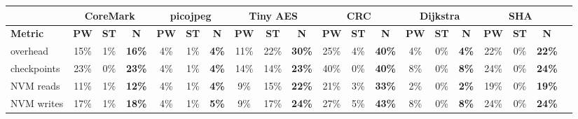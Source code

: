 \begin{tabular}{@{}l|ccccccccccccccccccc@{}}
\toprule
 & \multicolumn{3}{c}{\textbf{\textsf{CoreMark}}} & \multicolumn{3}{c}{\textbf{\textsf{picojpeg}}} & \multicolumn{3}{c}{\textbf{\textsf{Tiny AES}}} & \multicolumn{3}{c}{\textbf{\textsf{CRC}}} & \multicolumn{3}{c}{\textbf{\textsf{Dijkstra}}} & \multicolumn{3}{c}{\textbf{\textsf{SHA}}} \\ \midrule
\textbf{Metric} & \textbf{\textsf{PW}} & \textbf{\textsf{ST}} & \textbf{\textsf{N}} & \textbf{\textsf{PW}} & \textbf{\textsf{ST}} & \textbf{\textsf{N}} & \textbf{\textsf{PW}} & \textbf{\textsf{ST}} & \textbf{\textsf{N}} & \textbf{\textsf{PW}} & \textbf{\textsf{ST}} & \textbf{\textsf{N}} & \textbf{\textsf{PW}} & \textbf{\textsf{ST}} & \textbf{\textsf{N}} & \textbf{\textsf{PW}} & \textbf{\textsf{ST}} & \textbf{\textsf{N}} \\
overhead & 15\% & \hphantom{0}1\% & \textbf{\colorbox{hightlight!46!white}{16\%}} & \hphantom{0}4\% & \hphantom{0}1\% & \textbf{\colorbox{hightlight!34!white}{\hphantom{0}4\%}} & 11\% & 22\% & \textbf{\colorbox{hightlight!60!white}{30\%}} & 25\% & \hphantom{0}4\% & \textbf{\colorbox{hightlight!69!white}{40\%}} & \hphantom{0}4\% & \hphantom{0}0\% & \textbf{\colorbox{hightlight!33!white}{\hphantom{0}4\%}} & 22\% & \hphantom{0}0\% & \textbf{\colorbox{hightlight!51!white}{22\%}} \\
checkpoints & 23\% & \hphantom{0}0\% & \textbf{\colorbox{hightlight!53!white}{23\%}} & \hphantom{0}4\% & \hphantom{0}1\% & \textbf{\colorbox{hightlight!33!white}{\hphantom{0}4\%}} & 14\% & 14\% & \textbf{\colorbox{hightlight!52!white}{23\%}} & 40\% & \hphantom{0}0\% & \textbf{\colorbox{hightlight!70!white}{40\%}} & \hphantom{0}8\% & \hphantom{0}0\% & \textbf{\colorbox{hightlight!38!white}{\hphantom{0}8\%}} & 24\% & \hphantom{0}0\% & \textbf{\colorbox{hightlight!54!white}{24\%}} \\
NVM reads & 11\% & \hphantom{0}1\% & \textbf{\colorbox{hightlight!42!white}{12\%}} & \hphantom{0}4\% & \hphantom{0}1\% & \textbf{\colorbox{hightlight!33!white}{\hphantom{0}4\%}} & \hphantom{0}9\% & 15\% & \textbf{\colorbox{hightlight!51!white}{22\%}} & 21\% & \hphantom{0}3\% & \textbf{\colorbox{hightlight!62!white}{33\%}} & \hphantom{0}2\% & \hphantom{0}0\% & \textbf{\colorbox{hightlight!32!white}{\hphantom{0}2\%}} & 19\% & \hphantom{0}0\% & \textbf{\colorbox{hightlight!49!white}{19\%}} \\
NVM writes & 17\% & \hphantom{0}1\% & \textbf{\colorbox{hightlight!48!white}{18\%}} & \hphantom{0}4\% & \hphantom{0}1\% & \textbf{\colorbox{hightlight!34!white}{\hphantom{0}5\%}} & \hphantom{0}9\% & 17\% & \textbf{\colorbox{hightlight!53!white}{24\%}} & 27\% & \hphantom{0}5\% & \textbf{\colorbox{hightlight!72!white}{43\%}} & \hphantom{0}8\% & \hphantom{0}0\% & \textbf{\colorbox{hightlight!38!white}{\hphantom{0}8\%}} & 24\% & \hphantom{0}0\% & \textbf{\colorbox{hightlight!53!white}{24\%}} \\
 \bottomrule
\end{tabular}
